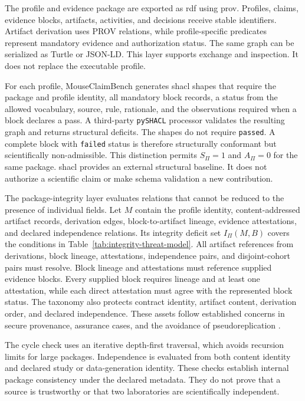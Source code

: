 The profile and evidence package are exported as \ac{rdf} using \ac{prov}. Profiles, claims, evidence blocks, artifacts, activities, and decisions receive stable identifiers. Artifact derivation uses PROV relations, while profile-specific predicates represent mandatory evidence and authorization status. The same graph can be serialized as Turtle or JSON-LD. This layer supports exchange and inspection. It does not replace the executable profile.

For each profile, MouseClaimBench generates \ac{shacl} shapes that require the package and profile identity, all mandatory block records, a status from the allowed vocabulary, source, rule, rationale, and the observations required when a block declares a pass. A third-party \texttt{pySHACL} processor validates the resulting graph and returns structural deficits. The shapes do not require \texttt{passed}. A complete block with \texttt{failed} status is therefore structurally conformant but scientifically non-admissible. This distinction permits $S_{\Pi}=1$ and $A_{\Pi}=0$ for the same package. \ac{shacl} provides an external structural baseline. It does not authorize a scientific claim or make schema validation a new contribution.

The package-integrity layer evaluates relations that cannot be reduced to the presence of individual fields. Let $M$ contain the profile identity, content-addressed artifact records, derivation edges, block-to-artifact lineage, evidence attestations, and declared independence relations. Its integrity deficit set $I_{\Pi}(M,B)$ covers the conditions in Table~\ref{tab:integrity-threat-model}. All artifact references from derivations, block lineage, attestations, independence pairs, and disjoint-cohort pairs must resolve. Block lineage and attestations must reference supplied evidence blocks. Every supplied block requires lineage and at least one attestation, while each direct attestation must agree with the represented block status. The taxonomy also protects contract identity, artifact content, derivation order, and declared independence. These assets follow established concerns in secure provenance, assurance cases, and the avoidance of pseudoreplication \citep{hasan2009provenance,mohamad2021assurance,lazic2010pseudoreplication}.


The cycle check uses an iterative depth-first traversal, which avoids recursion limits for large packages. Independence is evaluated from both content identity and declared study or data-generation identity. These checks establish internal package consistency under the declared metadata. They do not prove that a source is trustworthy or that two laboratories are scientifically independent.


